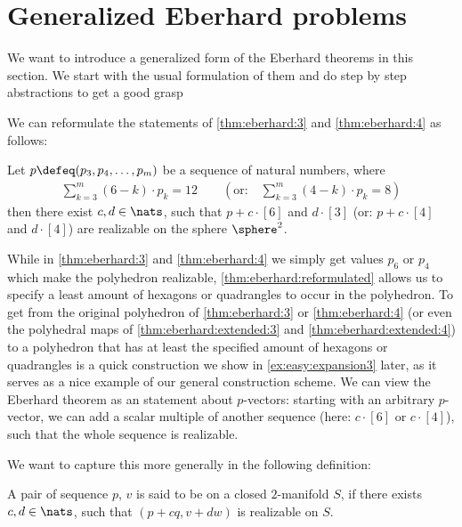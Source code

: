 \section{Generalized {\sc Eberhard} problems}\label{sec:gen:eberhard}

We want to introduce a generalized form of the {\sc Eberhard} theorems in this section. We start with the usual formulation of them and do step by step abstractions to get a good grasp

We can reformulate the statements of \autoref{thm:eberhard:3} and \autoref{thm:eberhard:4} as follows:
\begin{theorem}\label{thm:eberhard:reformulated}
  Let $p \defeq (p_3, p_4, \dots, p_m)$ be a sequence of natural numbers, where
  \begin{align*}
    \sum_{k=3}^m(6 - k) \cdot p_k = 12 \qquad \left( \text{or:}\quad \sum_{k=3}^m(4 - k) \cdot p_k = 8 \right)
  \end{align*}
  then there exist $c, d \in \nats$, such that $p + c \cdot [6]$ and $d \cdot [3]$ (or: $p + c \cdot [4]$ and $d \cdot [4]$) are realizable on the sphere $\sphere^2$.
\end{theorem}

\begin{remark}\label{rem:gen:is:no:gen}
While in \autoref{thm:eberhard:3} and \autoref{thm:eberhard:4} we simply get values $p_6$ or $p_4$ which make the polyhedron realizable, \autoref{thm:eberhard:reformulated} allows us to specify a least amount of hexagons or quadrangles to occur in the polyhedron. To get from the original polyhedron of \autoref{thm:eberhard:3} or \autoref{thm:eberhard:4} (or even the polyhedral maps of \autoref{thm:eberhard:extended:3} and \autoref{thm:eberhard:extended:4}) to a polyhedron that has at least the specified amount of hexagons or quadrangles is a quick construction we show in \autoref{ex:easy:expansion3} later, as it serves as a nice example of our general construction scheme. We can view the {\sc Eberhard} theorem as an statement about $p$-vectors: starting with an arbitrary $p$-vector, we can add a scalar multiple of another sequence (here: $c \cdot [6]$ or $c \cdot [4]$), such that the whole sequence is realizable.
\end{remark}

We want to capture this more generally in the following definition:
\begin{definition}[$q$-$w$-realizable]\label{def:eberhard:realizable}
  A pair of sequence $p$, $v$ is said to be  on a closed $2$-manifold $S$, if there exists $c, d \in \nats$, such that $(p + c q, v + d w)$ is realizable on $S$. 
\end{definition}

